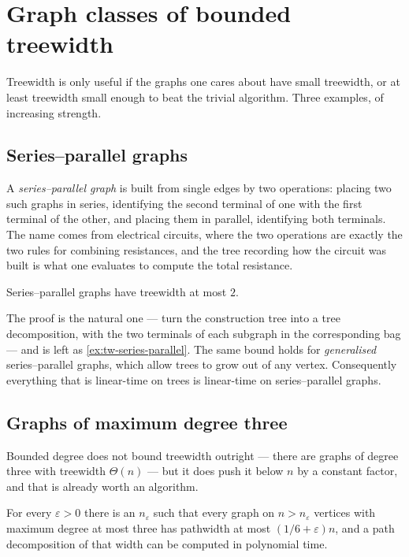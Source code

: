\section{Graph classes of bounded treewidth}
\label{sec:tw-graph-classes}

Treewidth is only useful if the graphs one cares about have small treewidth, or
at least treewidth small enough to beat the trivial algorithm. Three examples,
of increasing strength.

\subsection{Series--parallel graphs}

A \emph{series--parallel graph} is built from single edges by two operations:
placing two such graphs in series, identifying the second terminal of one with
the first terminal of the other, and placing them in parallel, identifying both
terminals. The name comes from electrical circuits, where the two operations are
exactly the two rules for combining resistances, and the tree recording how the
circuit was built is what one evaluates to compute the total resistance.

\begin{proposition}\label{prop:tw-series-parallel}
Series--parallel graphs have treewidth at most $2$.
\end{proposition}

The proof is the natural one --- turn the construction tree into a tree
decomposition, with the two terminals of each subgraph in the corresponding bag
--- and is left as \cref{ex:tw-series-parallel}. The same bound holds for
\emph{generalised} series--parallel graphs, which allow trees to grow out of any
vertex. Consequently everything that is linear-time on trees is linear-time on
series--parallel graphs.

\subsection{Graphs of maximum degree three}

Bounded degree does not bound treewidth outright --- there are graphs of degree
three with treewidth $\Theta(n)$ --- but it does push it below $n$ by a
constant factor, and that is already worth an algorithm.

\begin{theorem}\label{thm:fomin-hoie}
For every $\varepsilon > 0$ there is an $n_\varepsilon$ such that every graph on
$n > n_\varepsilon$ vertices with maximum degree at most three has pathwidth at
most $(1/6 + \varepsilon)n$, and a path decomposition of that width can be
computed in polynomial time.
\end{theorem}

